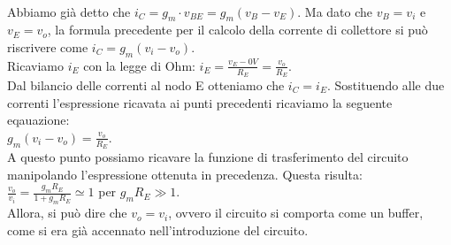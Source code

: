 \documentclass{report}
\begin{document}
\\Abbiamo già detto che $i_C=g_m\cdot v_{BE} = g_m(v_B-v_E) $. Ma dato che $v_B=v_i$ e $v_E=v_o$, la formula precedente per il calcolo della corrente di collettore si può riscrivere come $i_C=g_m(v_i-v_o)$.
\\[2pt]Ricaviamo $i_E$ con la legge di Ohm: 
$\displaystyle{i_E=\frac{v_E-0V}{R_E}=\frac{v_o}{R_E}}$.
\\[2 pt] Dal bilancio delle correnti al nodo E otteniamo che $i_C=i_E$. Sostituendo alle due correnti l'espressione ricavata ai punti precedenti ricaviamo la seguente eqauazione:
\\[2pt]\indent $\displaystyle{g_m(v_i-v_o)=\frac{v_o}{R_E}}$.
\\[2pt] A questo punto possiamo ricavare la funzione di trasferimento del circuito manipolando l'espressione ottenuta in precedenza. Questa risulta:
\\[2pt]\indent $\displaystyle{\frac{v_o}{v_i}=\frac{g_mR_E}{1+g_mR_E}\simeq1}$ per $g_mR_E\gg 1$. 
\\[2pt]Allora, si può dire che $v_o=v_i$, ovvero il circuito si comporta come un buffer, come si era già accennato nell'introduzione del circuito.
\end{document}
